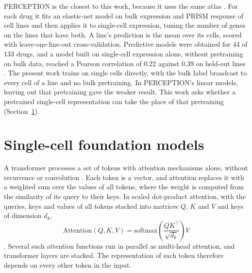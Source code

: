 PERCEPTION is the closest to this work, because it uses the same atlas \cite{perception,scp542}. For
each drug it fits an elastic-net model on bulk expression and PRISM response of cell lines and then
applies it to single-cell expression, tuning the number of genes on the lines that have both. A line's
prediction is the mean over its cells, scored with leave-one-line-out cross-validation. Predictive
models were obtained for 44 of 133 drugs, and a model built on single-cell expression alone, without
pretraining on bulk data, reached a Pearson correlation of 0.22 against 0.39 on held-out lines
\cite{perception}. The present work trains on single cells directly, with the bulk label broadcast to
every cell of a line and no bulk pretraining. In PERCEPTION's linear models, leaving out that
pretraining gave the weaker result. This work asks
whether a pretrained single-cell representation can take the place of that pretraining
(Section~\ref{sec:bg-foundation}).

\section{Single-cell foundation models}
\label{sec:bg-foundation}

A transformer processes a set of tokens with attention mechanisms alone, without recurrence or
convolution \cite{vaswani2017}. Each token is a vector, and attention replaces it with a weighted sum over
the values of all tokens, where the weight is computed from the similarity of its query to their keys. In
scaled dot-product attention, with the queries, keys and values of all tokens stacked into matrices $Q$,
$K$ and $V$ and keys of dimension $d_k$,
\begin{equation}
  \mathrm{Attention}(Q, K, V) = \mathrm{softmax}\!\left(\frac{QK^\top}{\sqrt{d_k}}\right) V
  \label{eq:attention}
\end{equation}
\cite{vaswani2017}. Several such attention functions run in parallel as multi-head attention, and
transformer layers are stacked. The representation of each token therefore depends on every other token
in the input.


